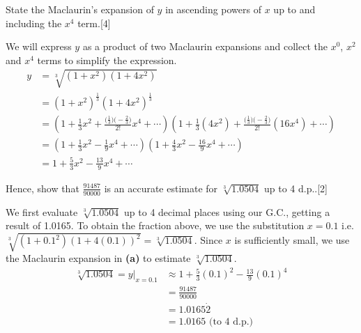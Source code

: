 \documentclass[12pt, a4 paper]{article}
\begin{document}
\begin{outline}[enumerate]
 \2 State the Maclaurin's expansion of \(y\) in ascending powers of \(x\) up to and including the \(x^4\) term.\hfill[4]
 \begin{answer}
  We will express \(y\) as a product of two Maclaurin expansions and collect the \(x^0\), \(x^2\) and \(x^4\) terms to simplify the expression.
  \begin{align*}
   y & =\sqrt[3]{(1+x^2)(1+4x^2)}                                                                                                                                                            \\
     & = {(1+x^2)}^{\frac{1}{3}}{(1+4x^2)}^{\frac{1}{3}}                                                                                                                                     \\
     & = \left(1+\frac{1}{3}x^2+\frac{\big(\frac{1}{3})\big(-\frac{2}{3})}{2!}x^4+\cdots\right)\left(1+\frac{1}{3}(4x^2)+\frac{\big(\frac{1}{3})\big(-\frac{2}{3})}{2!}(16x^4)+\cdots\right) \\
     & = \left(1+\frac{1}{3}x^2-\frac{1}{9}x^4+\cdots\right)\left(1+\frac{4}{3}x^2-\frac{16}{9}x^4+\cdots\right)                                                                             \\
     & = 1 + \frac{5}{3}x^2 - \frac{13}{9}x^4 +\cdots
  \end{align*}
 \end{answer}
 \2 Hence, show that \(\frac{91487}{90000}\) is an accurate estimate for \(\sqrt[3]{1.0504}\)  up to 4 d.p..\hfill[2]
 \begin{answer}
  We first evaluate \(\sqrt[3]{1.0504}\) up to 4 decimal places using our G.C., getting a result of 1.0165. To obtain the fraction above, we use the substitution \(x=0.1\) i.e. \(\sqrt[3]{(1+0.1^2){(1+4(0.1))}^2}=\sqrt[3]{1.0504}\). Since \(x\) is sufficiently small, we use the Maclaurin expansion in \textbf{(a)} to estimate \(\sqrt[3]{1.0504}\).
  \begin{align*}
   \sqrt[3]{1.0504} = \left.y\right|_{x=0.1} & \approx 1 + \frac{5}{3}{(0.1)}^2 - \frac{13}{9}{(0.1)}^4 \\
                                             & = \frac{91487}{90000}                                    \\
                                             & = 1.0165\dot{2}                                          \\
                                             & = 1.0165 \textrm{ (to 4 d.p.)}
  \end{align*}
 \end{answer}


\end{outline}
\end{document}
